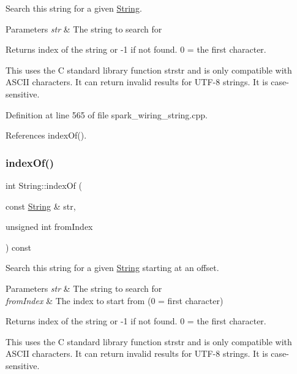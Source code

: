 Search this string for a given \hyperlink{class_string}{String}. 


\begin{DoxyParams}{Parameters}
{\em str} & The string to search for\\
\hline
\end{DoxyParams}
\begin{DoxyReturn}{Returns}
index of the string or -\/1 if not found. 0 = the first character.
\end{DoxyReturn}
This uses the C standard library function strstr and is only compatible with A\+S\+C\+II characters. It can return invalid results for U\+T\+F-\/8 strings. It is case-\/sensitive. 

Definition at line 565 of file spark\+\_\+wiring\+\_\+string.\+cpp.



References index\+Of().

\mbox{\label{class_string_aecbe2471a60329e53d31bd85c24c38a9}} 
\subsubsection{\texorpdfstring{index\+Of()}{indexOf()}\hspace{0.1cm}{\footnotesize\ttfamily [4/4]}}
{\footnotesize\ttfamily int String\+::index\+Of (\begin{DoxyParamCaption}\item[{const \hyperlink{class_string}{String} \&}]{str,  }\item[{unsigned int}]{from\+Index }\end{DoxyParamCaption}) const}



Search this string for a given \hyperlink{class_string}{String} starting at an offset. 


\begin{DoxyParams}{Parameters}
{\em str} & The string to search for\\
\hline
{\em from\+Index} & The index to start from (0 = first character)\\
\hline
\end{DoxyParams}
\begin{DoxyReturn}{Returns}
index of the string or -\/1 if not found. 0 = the first character.
\end{DoxyReturn}
This uses the C standard library function strstr and is only compatible with A\+S\+C\+II characters. It can return invalid results for U\+T\+F-\/8 strings. It is case-\/sensitive. 

